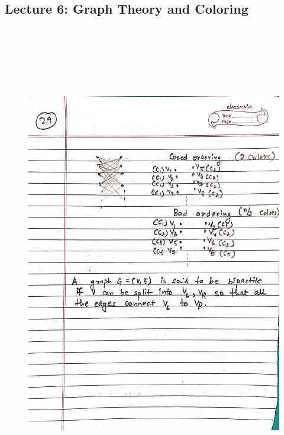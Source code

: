\newpage
{\color{black} \subsection*{Lecture 6: Graph Theory and Coloring}}
\begin{figure}[H]
    \centering
    \includegraphics[width=16cm, height=21cm]{"./MIT-6.042J/MIT-6042J-029"}
\end{figure}

